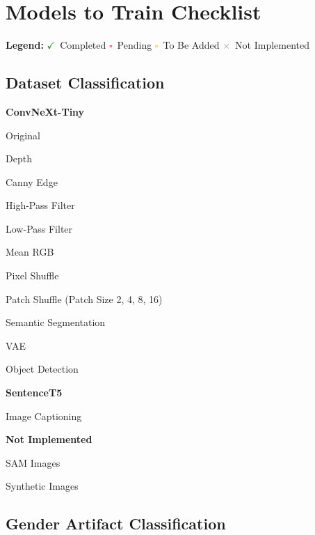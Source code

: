\documentclass{article}
\newcommand{\done}{\textcolor{green}{$\checkmark$}}    %
\newcommand{\todo}{\textcolor{red}{$\square$}}          %
\newcommand{\tbadded}{\textcolor{orange}{$\square$}}    %
\newcommand{\notimpl}{\textcolor{gray}{$\times$}}       %
\begin{document}
	
	\section*{Models to Train Checklist}
	
	\noindent\textbf{Legend:} 
	\done\ Completed \quad 
	\todo\ Pending \quad 
	\tbadded\ To Be Added \quad 
	\notimpl\ Not Implemented
	
	\subsection*{Dataset Classification}
	
	\textbf{ConvNeXt-Tiny}
	\begin{checklist}
		\item[\done] Original
		\item[\done] Depth
		\item[\done] Canny Edge
		\item[\done] High-Pass Filter
		\item[\done] Low-Pass Filter
		\item[\done] Mean RGB
		\item[\done] Pixel Shuffle
		\item[\done] Patch Shuffle (Patch Size 2, 4, 8, 16)
		\item[\done] Semantic Segmentation
		\item[\done] VAE
		\item[\done] Object Detection
	\end{checklist}
	
	\textbf{SentenceT5}
	\begin{checklist}
		\item[\done] Image Captioning
	\end{checklist}
	
	\textbf{Not Implemented}
	\begin{checklist}
		\item[\notimpl] SAM Images
		\item[\notimpl] Synthetic Images
	\end{checklist}
	
	\newpage
	\subsection*{Gender Artifact Classification}
	
\end{document}
